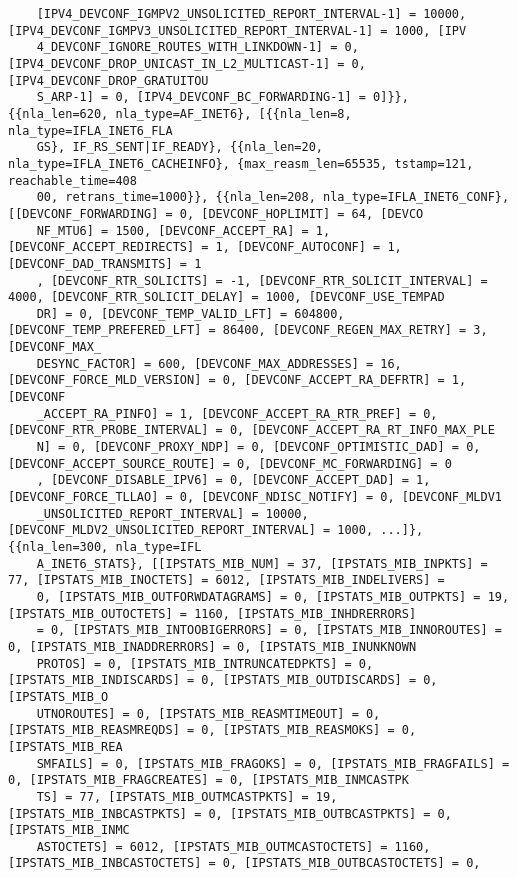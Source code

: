 \documentclass[pdf, unicode, 12pt, a4paper,oneside,fleqn]{article}
\begin{document}
{\begin{verbatim}
    [IPV4_DEVCONF_IGMPV2_UNSOLICITED_REPORT_INTERVAL-1] = 10000, [IPV4_DEVCONF_IGMPV3_UNSOLICITED_REPORT_INTERVAL-1] = 1000, [IPV
    4_DEVCONF_IGNORE_ROUTES_WITH_LINKDOWN-1] = 0, [IPV4_DEVCONF_DROP_UNICAST_IN_L2_MULTICAST-1] = 0, [IPV4_DEVCONF_DROP_GRATUITOU
    S_ARP-1] = 0, [IPV4_DEVCONF_BC_FORWARDING-1] = 0]}}, {{nla_len=620, nla_type=AF_INET6}, [{{nla_len=8, nla_type=IFLA_INET6_FLA
    GS}, IF_RS_SENT|IF_READY}, {{nla_len=20, nla_type=IFLA_INET6_CACHEINFO}, {max_reasm_len=65535, tstamp=121, reachable_time=408
    00, retrans_time=1000}}, {{nla_len=208, nla_type=IFLA_INET6_CONF}, [[DEVCONF_FORWARDING] = 0, [DEVCONF_HOPLIMIT] = 64, [DEVCO
    NF_MTU6] = 1500, [DEVCONF_ACCEPT_RA] = 1, [DEVCONF_ACCEPT_REDIRECTS] = 1, [DEVCONF_AUTOCONF] = 1, [DEVCONF_DAD_TRANSMITS] = 1
    , [DEVCONF_RTR_SOLICITS] = -1, [DEVCONF_RTR_SOLICIT_INTERVAL] = 4000, [DEVCONF_RTR_SOLICIT_DELAY] = 1000, [DEVCONF_USE_TEMPAD
    DR] = 0, [DEVCONF_TEMP_VALID_LFT] = 604800, [DEVCONF_TEMP_PREFERED_LFT] = 86400, [DEVCONF_REGEN_MAX_RETRY] = 3, [DEVCONF_MAX_
    DESYNC_FACTOR] = 600, [DEVCONF_MAX_ADDRESSES] = 16, [DEVCONF_FORCE_MLD_VERSION] = 0, [DEVCONF_ACCEPT_RA_DEFRTR] = 1, [DEVCONF
    _ACCEPT_RA_PINFO] = 1, [DEVCONF_ACCEPT_RA_RTR_PREF] = 0, [DEVCONF_RTR_PROBE_INTERVAL] = 0, [DEVCONF_ACCEPT_RA_RT_INFO_MAX_PLE
    N] = 0, [DEVCONF_PROXY_NDP] = 0, [DEVCONF_OPTIMISTIC_DAD] = 0, [DEVCONF_ACCEPT_SOURCE_ROUTE] = 0, [DEVCONF_MC_FORWARDING] = 0
    , [DEVCONF_DISABLE_IPV6] = 0, [DEVCONF_ACCEPT_DAD] = 1, [DEVCONF_FORCE_TLLAO] = 0, [DEVCONF_NDISC_NOTIFY] = 0, [DEVCONF_MLDV1
    _UNSOLICITED_REPORT_INTERVAL] = 10000, [DEVCONF_MLDV2_UNSOLICITED_REPORT_INTERVAL] = 1000, ...]}, {{nla_len=300, nla_type=IFL
    A_INET6_STATS}, [[IPSTATS_MIB_NUM] = 37, [IPSTATS_MIB_INPKTS] = 77, [IPSTATS_MIB_INOCTETS] = 6012, [IPSTATS_MIB_INDELIVERS] =
    0, [IPSTATS_MIB_OUTFORWDATAGRAMS] = 0, [IPSTATS_MIB_OUTPKTS] = 19, [IPSTATS_MIB_OUTOCTETS] = 1160, [IPSTATS_MIB_INHDRERRORS]
    = 0, [IPSTATS_MIB_INTOOBIGERRORS] = 0, [IPSTATS_MIB_INNOROUTES] = 0, [IPSTATS_MIB_INADDRERRORS] = 0, [IPSTATS_MIB_INUNKNOWN
    PROTOS] = 0, [IPSTATS_MIB_INTRUNCATEDPKTS] = 0, [IPSTATS_MIB_INDISCARDS] = 0, [IPSTATS_MIB_OUTDISCARDS] = 0, [IPSTATS_MIB_O
    UTNOROUTES] = 0, [IPSTATS_MIB_REASMTIMEOUT] = 0, [IPSTATS_MIB_REASMREQDS] = 0, [IPSTATS_MIB_REASMOKS] = 0, [IPSTATS_MIB_REA
    SMFAILS] = 0, [IPSTATS_MIB_FRAGOKS] = 0, [IPSTATS_MIB_FRAGFAILS] = 0, [IPSTATS_MIB_FRAGCREATES] = 0, [IPSTATS_MIB_INMCASTPK
    TS] = 77, [IPSTATS_MIB_OUTMCASTPKTS] = 19, [IPSTATS_MIB_INBCASTPKTS] = 0, [IPSTATS_MIB_OUTBCASTPKTS] = 0, [IPSTATS_MIB_INMC
    ASTOCTETS] = 6012, [IPSTATS_MIB_OUTMCASTOCTETS] = 1160, [IPSTATS_MIB_INBCASTOCTETS] = 0, [IPSTATS_MIB_OUTBCASTOCTETS] = 0, 

\end{verbatim}}
\end{document}

